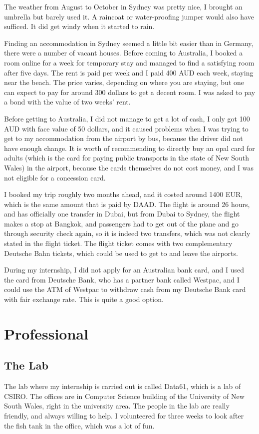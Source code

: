 \documentclass[adraft]{eptcs}
\begin{document}
The weather from August to October in Sydney was pretty nice, I brought an umbrella but barely used it. A raincoat or water-proofing jumper would also have sufficed. It did get windy when it started to rain. 

Finding an accommodation in Sydney seemed a little bit easier than in Germany, there were a number of vacant houses. Before coming to Australia, I booked a room online for a week for temporary stay and managed to find a satisfying room after five days. The rent is paid per week and I paid 400 AUD each week, staying near the beach. The price varies, depending on where you are staying, but one can expect to pay for around 300 dollars to get a decent room. I was asked to pay a bond with the value of two weeks' rent. 

Before getting to Australia, I did not manage to get a lot of cash, I only got 100 AUD with face value of 50 dollars, and it caused problems when I was trying to get to my accommodation from the airport by bus, because the driver did not have enough change. It is worth of recommending to directly buy an opal card for adults (which is the card for paying public transports in the state of New South Wales) in the airport, because the cards themselves do not cost money, and I was not eligible for a concession card. 

I booked my trip roughly two months ahead, and it costed around 1400 EUR, which is the same amount that is paid by DAAD. The flight is around 26 hours, and has officially one transfer in Dubai, but from Dubai to Sydney, the flight makes a stop at Bangkok, and passengers had to get out of the plane and go through security check again, so it is indeed two transfers, which was not clearly stated in the flight ticket. The flight ticket comes with two complementary Deutsche Bahn tickets, which could be used to get to and leave the airports. 

During my internship, I did not apply for an Australian bank card, and I used the card from Deutsche Bank, who has a partner bank called Westpac, and I could use the ATM of Westpac to withdraw cash from my Deutsche Bank card with fair exchange rate. This is quite a good option. 


\section{Professional}
\subsection{The Lab}
The lab where my internship is carried out is called Data61, which is a lab of CSIRO. The offices are in Computer Science building of the University of New South Wales, right in the university area. The people in the lab are really friendly, and always willing to help. I volunteered for three weeks to look after the fish tank in the office, which was a lot of fun. 
\end{document}
